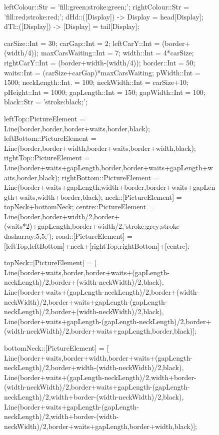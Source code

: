 \documentclass[5p,times]{elsarticle}
\begin{document}
\begin{figure}
\begin{FigESL}
leftColour::Str               = 'fill:green;stroke:green;';  rightColour::Str              = 'fill:red;stroke:red;';
dHd::([Display]) -> Display   = head[Display];               dTl::([Display]) -> [Display] = tail[Display];

carSize::Int        = 30;           carGap::Int    = 2;                                leftCarY::Int  = (border+(width/4));
maxCarsWaiting::Int = 7;            width::Int     = 4*carSize;                        rightCarY::Int = (border+width-(width/4));
border::Int         = 50;           waits::Int     = (carSize+carGap)*maxCarsWaiting;  pWidth::Int    = 1500;
neckLength::Int.    = 100;          neckWidth::Int = carSize+10;                       pHeight::Int   = 1000;
gapLength::Int      = 150;          gapWidth::Int  = 100;                              black::Str     = 'stroke:black;';

leftTop::PictureElement     = Line(border,border,border+waits,border,black);
leftBottom::PictureElement  = Line(border,border+width,border+waits,border+width,black);
rightTop::PictureElement    = Line(border+waits+gapLength,border,border+waits+gapLength+waits,border,black);
rightBottom::PictureElement = Line(border+waits+gapLength,width+border,border+waits+gapLength+waits,width+border,black);
neck::[PictureElement]      = topNeck+bottomNeck;
centre::PictureElement      = Line(border,border+width/2,border+(waits*2)+gapLength,border+width/2,'stroke:grey;stroke-dasharray:5,5;');
road::[PictureElement]      = [leftTop,leftBottom]+neck+[rightTop,rightBottom]+[centre];

topNeck::[PictureElement] = [
  Line(border+waits,border,border+waits+(gapLength-neckLength)/2,border+(width-neckWidth)/2,black),
  Line(border+waits+(gapLength-neckLength)/2,border+(width-neckWidth)/2,border+waits+gapLength-(gapLength-neckLength)/2,border+(width-neckWidth)/2,black),
  Line(border+waits+gapLength-(gapLength-neckLength)/2,border+(width-neckWidth)/2,border+waits+gapLength,border,black)];
  
bottomNeck::[PictureElement] = [
  Line(border+waits,border+width,border+waits+(gapLength-neckLength)/2,border+width-(width-neckWidth)/2,black),
  Line(border+waits+(gapLength-neckLength)/2,width+border-(width-neckWidth)/2,border+waits+gapLength-(gapLength-neckLength)/2,width+border-(width-neckWidth)/2,black),
  Line(border+waits+gapLength-(gapLength-neckLength)/2,width+border-(width-neckWidth)/2,border+waits+gapLength,border+width,black)];
  

\end{FigESL}
\end{figure}
\end{document}
